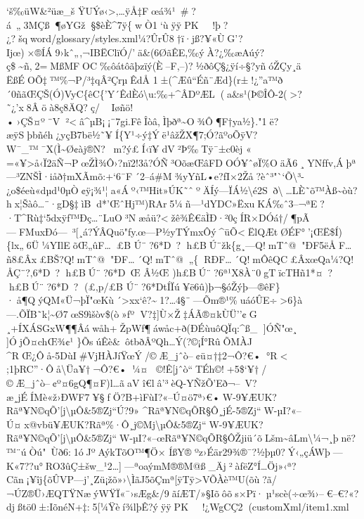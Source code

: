 `š‰üW\&²üæ\_š
ŸUÝø‹\textgreater‚\ldots ÿÅ‡Fœ\textbar á¾¹~\#?á~„3MÇß¶øYGž§\$èÈ\^{}7ÿ\{wÒ1`ù  ÿÿ PK     ! þ?¿?  šq     word/glossary/styles.xml¼?ÛrÛ8†ï·jß?¥«ÙG'?Ijœ)×®ÍÁ9›kˆ„,¬IBËClïÓ/ 'ä\&(6ØãÊE,‰ýÀ?¿‰æAúý?ç\$\textasciitilde ñ,2=MßMFOC‰ôátôãþzïý(È--F,--)?½ð\textbar ôÇ§¿ÿí÷§?yñóŽÇy¸ä
ËßÉOÕ‡™\%¬P/³‡qÂ²ÇrµÊdÅ
1±(\^{}Æû``Éñ¨Æd\}(r±!¿''a™ð´0ñãŒÇŠ(Ó\textbar)VyC\{êC\{'Y´ÊdÈó\textbackslash u:‰+\^{}ÂDºÆL(a\&s¹(Þ©ÎÔ-2(\textgreater?˜¿'x8Âöà8ç8ÄQ?ç/
Iøñö!•›ÇŠ¤º¨V²\textlessâ\^{}µB¡¡¨7gi.FêÎòâ,Ìþðª\textasciitilde O¾Ô¶F†ya½\}."1ë?æÿSþbñéh¿yçB7bë½˜¥Í\{Y¹÷ý‡Ýë­¹âžŽX¶7;Ó?ãºoÕÿV?W¯\_™¯X(Ì\textasciitilde Ø¢àj®N?\textquotesinglem?ý£Í‹ï¥dV²Þ‰Tÿ¯±c0èj
«
=«\textbar¥\textgreater å‹Ï2\textbar äÑ¬PœŽÌ¾Ô›?nï2!3å?ÓÑ³OõæŒ\textquotesingle âFDO­Ó¥ˆøÏ\%OäÃ6¸YNfƒv,Áþª---³ZNŠÌ·iåð†mXÃmõ:+`6¯F´2--á\#M¾yYñL•e?ƒI×2Žå?èˆ³"``Õ\textbackslash³-¿o\$éeù«dµd¹0µÒ¢ÿ¡¾¹¦\textbar a«Áº‹™Hit»ÚK˜ˆºÄÍý---ÏÁ½\textbackslash é2Sð\textbackslash\ldots LÈ˜õ™Àß\textasciitilde òù?hx¦Šàô\ldots¨·gD§‡ìBd*'ŒˆHj™)RAr5¼ñ---¹dYDC»ËxuKÁ‰ˆ3--¬ªE?·T\^{}\textbar Rù‡`5dxÿf™Ðç\ldots¨LuO³Næåü?\textlessžê¾Ê€äÌÐ·²0çÍR×DÓá†/¶pÃ---FMuxÐó---~³{[}¸á?ÝÂQuö"fy.œ---P½yTÝmxÔý\^{}üÕ\textlessËlQÆtØ ÉF°'¡ŒË\$Í)\{lx„6Ü¼YIlEõŒ„ûF\ldots£B
Ú¨?6*D~?
h£BÚ¨žk\{g¸---Q!mTˆ@"ÐF5ëÅF\ldots ñ8£Âx£BŠ?Q!mTˆ@"ÐF\ldots´Q!mTˆ@„\{RÐF\ldots´Q!mÔêQC£ÂxœQa¼?Q!ÅÇ¨?‚6*D~?
h£BÚ¨?6*D~Œ Â½Œ )h£BÚ¨?6ª¹X8À¨0gTïcTHñ1*¤~? h£BÚ¨?6*D~? (£‚p/£B
Ú¨?6*DtÍÏú¥ë6û)þ¬§óŽýþ---®êF\}·å¶QýQM«Ü¬þÏ"œKù´\textgreater xx`ê?\textasciitilde1?\ldots4§¨---Õm®¹\%uáóÛE÷\textgreater6\}à---.ÕÏB˜k¦ \textasciitilde Ø7œS9ìšòv\$(ò»fº
V?‡{]}Ù×Ž‡ÁÃ®¤k\textbar ÙÜ''¢G
¸+ÍXÁSGxW¶¶Âáwåh+ŽpWf¶á wåc+ð(ÐÉùuôQÏq:\^{}ß\_ {]}ÓÑ"œ¸ {]}ÓjÕ¤chŒ¾¢¹
\}ÕsúÊè\&~ôtbðÂºQh\ldots Ý(?©¡Í°RûÕMÀJ
\^{}RŒ¿Ôå-5DùI\#VjHÀJíŸœÝ/©Æ\_jˆò--¢ü¤†‡2¬Ô?€•°R\textless{}
;1þRC''·Ôå\textbackslash Üa¥†¬Ô?€•¼¤©!Ê{[}jˆò``TÉh©!+5\$`¥†/©Æ\_jˆò--¢º¤6gQ¶¤F)l\ldots ãaV
î€lâ'³èQ-YÑžÕ'Eð¬--~V?æ¸jÉÍMè«ž›ÐWF7¥§ƒÖ?B+ìFùI?«--Ú¤ö7ª›€•W-9¥ÆUK?Rãª¥N©qÕ'{[}j\textbackslash µÔ\&5®Zj``Ú?9»
\^{}Rãª¥N©qÕR§Ô¸jÉ-5®Zj``W-µI?«--Ú¤x@vbü¥ÆUK?Rãª\%·Ô¸j©Mj\textbackslash µÔ\&5®Zj``W-9¥ÆUK?Rãª¥N©qÕ'{[}j\textbackslash µÔ\&5®Zj``W-µI?«--œRãª¥N©qÕR§ÔŽjiü´õLšm\textasciitilde âLm\textbackslash¼¬¸þnë?™¨úÒú"~Ùð6:1óJºAýkTõO\textquotesingle™¶Ö×
ÍßY® ºz›Éär29¾®¯?½þµ­0?Ý‹„çÁWþ\textbar---
K«7??u°RO3ûÇ±šw­\_¹2\ldots{]}---ªoaýmM®®M@ß\_Äj²àfëZ°Í\ldots Öj»­‹ª?Cãn¡¥îj\{õÛVP---j'¸Zü¡žõ»›\textbackslash ÌãJ5õÇmª{[}ÿTÿ\textgreater VÕÀè™U(õù?ã/¬ÚZ®Ü›Æ\textbar QTŸN\textquotesingle æýWŸÏ«¯›sÆg\&/9ãíÆT/»§Iõôõs×Pï·µ¹scè(÷œ¾›--€--€\textquotesingle?«?djßtö0±:IõnéN+‡:5{[}¼Ÿèí¾lþÊ?ý  ÿÿ PK     ! ¿WgCÇ   2   ( customXml/item1.xml
